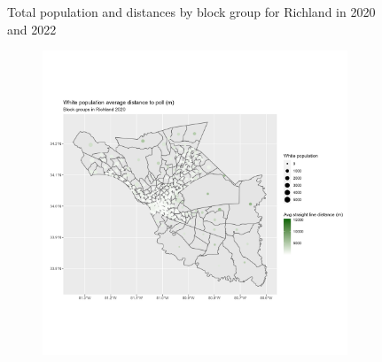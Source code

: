 \documentclass[11pt]{article}
\theoremstyle{remark}
\theoremstyle{definition}
\begin{document}
\begin{figure}
\begin{subfigure}{.5\textwidth}
		\label{sfig:Richland_2022_bg_dist}
	\end{subfigure}
	\caption{Total population and distances by block group for Richland in 2020 and 2022}
	\label{fig:Richland distance Total population maps}
\end{figure}

\begin{figure}
	\begin{subfigure}{.5\textwidth}
		\centering
		\includegraphics[width=\linewidth]{result analysis/Richland_SC_original_configs/white_pop_and_dist_Richland_config_original_2020_polls.png}
		\label{sfig:York_2020_bg_dist_pop}
	\end{subfigure} 
	\begin{subfigure}{.5\textwidth}
		\centering

\end{subfigure}
\end{figure}
\end{document}
